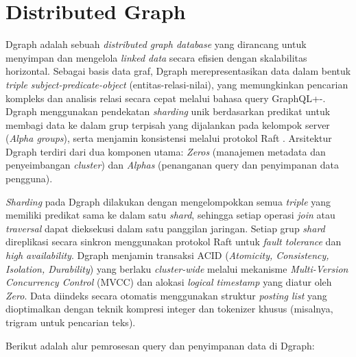 \section{Distributed Graph}
\label{sec:dgraph}

Dgraph adalah sebuah \textit{distributed graph database} yang dirancang untuk menyimpan dan mengelola \textit{linked data} secara efisien dengan skalabilitas horizontal. Sebagai basis data graf, Dgraph merepresentasikan data dalam bentuk \textit{triple} \textit{subject-predicate-object} (entitas-relasi-nilai), yang memungkinkan pencarian kompleks dan analisis relasi secara cepat melalui bahasa query GraphQL+-. Dgraph menggunakan pendekatan \textit{sharding} unik berdasarkan predikat untuk membagi data ke dalam grup terpisah yang dijalankan pada kelompok server (\textit{Alpha groups}), serta menjamin konsistensi melalui protokol Raft \parencite{jain2005dgraph}. Arsitektur Dgraph terdiri dari dua komponen utama: \textit{Zeros} (manajemen metadata dan penyeimbangan \textit{cluster}) dan \textit{Alphas} (penanganan query dan penyimpanan data pengguna). 

\textit{Sharding} pada Dgraph dilakukan dengan mengelompokkan semua \textit{triple} yang memiliki predikat sama ke dalam satu \textit{shard}, sehingga setiap operasi \textit{join} atau \textit{traversal} dapat dieksekusi dalam satu panggilan jaringan. Setiap grup \textit{shard} direplikasi secara sinkron menggunakan protokol Raft untuk \textit{fault tolerance} dan \textit{high availability}. Dgraph menjamin transaksi ACID (\textit{Atomicity, Consistency, Isolation, Durability}) yang berlaku \textit{cluster-wide} melalui mekanisme \textit{Multi-Version Concurrency Control} (MVCC) dan alokasi \textit{logical timestamp} yang diatur oleh \textit{Zero}. Data diindeks secara otomatis menggunakan struktur \textit{posting list} yang dioptimalkan dengan teknik kompresi integer dan tokenizer khusus (misalnya, trigram untuk pencarian teks).

Berikut adalah alur pemrosesan query dan penyimpanan data di Dgraph:


